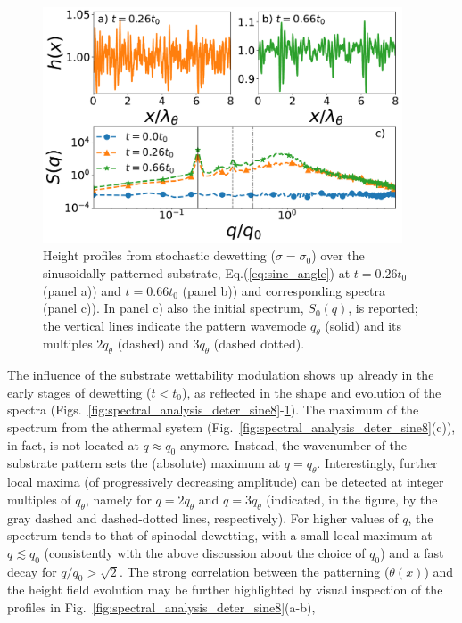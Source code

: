 \begin{figure}
    \centering
    \includegraphics[width=0.95\textwidth]{graphics/psd_spacedepCA_sine_25_10_1e-7_[0, 450000, 1150000]_9_3_rescaled.pdf}
    \caption{Height profiles from stochastic dewetting ($\sigma=\sigma_0$) 
    over the sinusoidally patterned substrate, Eq.(\ref{eq:sine_angle}) at $t=0.26 t_0$ (panel a)) and $t=0.66 t_0$ (panel b))  
    and corresponding spectra (panel c)).  
    In panel c) also the initial spectrum, $S_0(q)$, is reported; the vertical lines indicate the pattern wavemode $q_{\theta}$ (solid) and its multiples $2q_{\theta}$ (dashed) and $3q_{\theta}$ (dashed dotted).}
    \label{fig:spectral_analysis_stoch_sine8}
\end{figure}
The influence of the substrate wettability modulation shows up already in the early stages of dewetting ($t<t_0$), as reflected
 in the shape and evolution of the spectra (Figs.~\ref{fig:spectral_analysis_deter_sine8}-\ref{fig:spectral_analysis_stoch_sine8}). 
The maximum of the spectrum from the athermal system 
(Fig.~\ref{fig:spectral_analysis_deter_sine8}(c)), in fact, is not located at $q \approx q_0$ anymore.
Instead, the wavenumber of the substrate pattern sets the (absolute) maximum at $q=q_{\theta}$. 
Interestingly, further local maxima (of progressively decreasing amplitude) can be detected at integer multiples of $q_{\theta}$, namely for $q=2q_{\theta}$ and $q=3q_{\theta}$ (indicated, in the figure, by the gray dashed and dashed-dotted lines, respectively).
For higher values of $q$, the spectrum tends to that of spinodal dewetting,
with a small local maximum at $q \lesssim q_0$ (consistently with the above discussion about the choice of $q_0$)
and a fast decay for $q/q_0 > \sqrt{2}$.
The strong correlation between the patterning ($\theta(x)$) and the height field evolution may be further highlighted by visual inspection of the profiles in Fig.~\ref{fig:spectral_analysis_deter_sine8}(a-b), 
